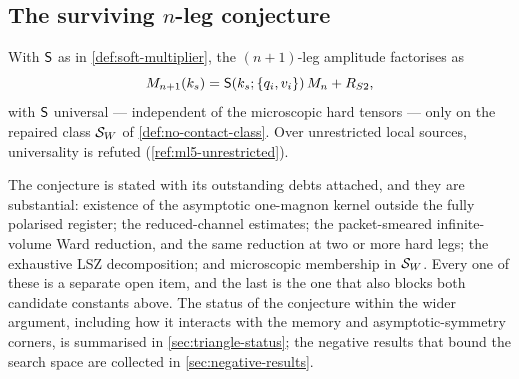 
\subsection{The surviving \texorpdfstring{$n$}{n}-leg conjecture}

\begin{conjecture}
\label{conj:s-general}
\statusConjecture

With $\mathsf{S}$ as in \cref{def:soft-multiplier}, the $(n+1)$-leg amplitude
factorises as
\begin{equation}
  M_{n+1}(k_s)=\mathsf{S}(k_s;\{q_i,v_i\})\,M_n+R_{S2},
  \label{eq:s-general}
\end{equation}
with $\mathsf{S}$ universal --- independent of the microscopic hard tensors --- only
on the repaired class $\mathcal{S}_W$ of \cref{def:no-contact-class}. Over
unrestricted local sources, universality is refuted
(\cref{ref:ml5-unrestricted}).
\end{conjecture}

\begin{scope}
\label{scope:s-general}
The conjecture is stated with its outstanding debts attached, and they are
substantial: existence of the asymptotic one-magnon kernel outside the fully
polarised register; the reduced-channel estimates; the packet-smeared
infinite-volume Ward reduction, and the same reduction at two or more hard
legs; the exhaustive LSZ decomposition; and microscopic membership in
$\mathcal{S}_W$. Every one of these is a separate open item, and the last is the
one that also blocks both candidate constants above. The status of the
conjecture within the wider argument, including how it interacts with the
memory and asymptotic-symmetry corners, is summarised in
\cref{sec:triangle-status}; the negative results that bound the search space
are collected in \cref{sec:negative-results}.
\end{scope}

